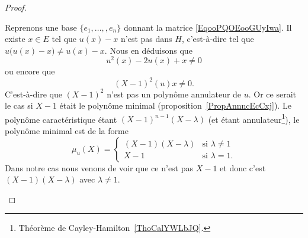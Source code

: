 \begin{proof}
\begin{subproof}
		Reprenons une base \( \{ e_1,\ldots, ,e_n \}\) donnant la matrice \eqref{EqooPQOEooGUyIwa}. Il existe \( x\in E\) tel que \( u(x)-x\) n'est pas dans \( H\), c'est-à-dire tel que \( u\big( u(x)-x \big)\neq u(x)-x\). Nous en déduisons que
		\begin{equation}
			u^2(x)-2u(x)+x\neq 0
		\end{equation}
		ou encore que
		\begin{equation}
			(X-1)^2(u)x\neq 0.
		\end{equation}
		C'est-à-dire que \( (X-1)^2\) n'est pas un polynôme annulateur de \( u\). Or ce serait le cas si \( X-1\) était le polynôme minimal (proposition~\ref{PropAnnncEcCxj}). Le polynôme caractéristique étant \( (X-1)^{n-1}(X-\lambda)\) (et étant annulateur\footnote{Théorème de Cayley-Hamilton~\ref{ThoCalYWLbJQ}.}), le polynôme minimal est de la forme
		\begin{equation}
			\mu_u(X)=\begin{cases}
				(X-1)(X-\lambda) & \text{si } \lambda\neq 1 \\
				X-1              & \text{si } \lambda=1.
			\end{cases}
		\end{equation}
		Dans notre cas nous venons de voir que ce n'est pas \( X-1\) et donc c'est \( (X-1)(X-\lambda)\) avec \( \lambda\neq 1\).


\end{subproof}
\end{proof}
